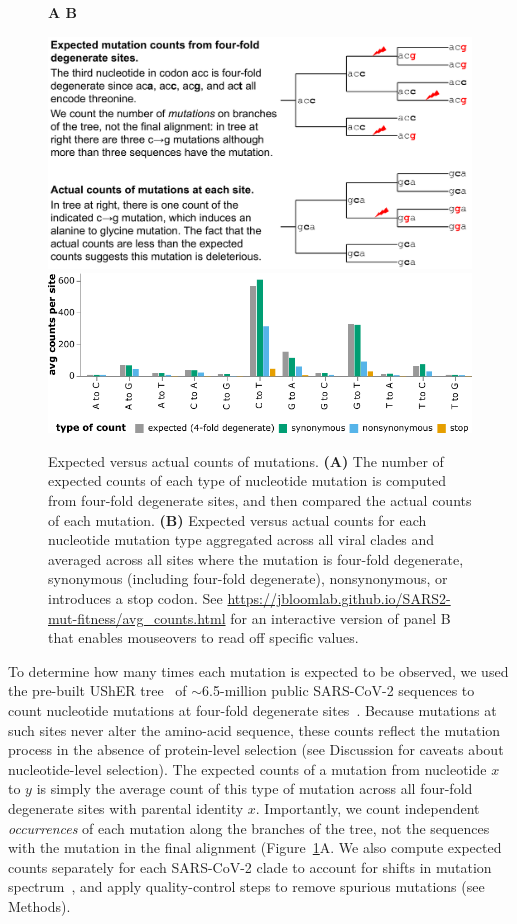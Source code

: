 \documentclass[9pt,twocolumn,twoside]{gsajnl_modified}
\begin{document}
\begin{figure}
{\bf \Large A \hspace{0.47\linewidth} B}

\includegraphics[width=0.48\linewidth,valign=t]{figs/schematic/schematic.pdf}
\hspace{0.02\linewidth}
\includegraphics[width=0.5\linewidth,valign=t]{figs/avg_counts.pdf}
\caption{
Expected versus actual counts of mutations.
{\bf (A)}
The number of expected counts of each type of nucleotide mutation is computed from four-fold degenerate sites, and then compared the actual counts of each mutation.
{\bf (B)}
Expected versus actual counts for each nucleotide mutation type aggregated across all viral clades and averaged across all sites where the mutation is four-fold degenerate, synonymous (including four-fold degenerate), nonsynonymous, or introduces a stop codon.
See \url{https://jbloomlab.github.io/SARS2-mut-fitness/avg_counts.html} for an interactive version of panel B that enables mouseovers to read off specific values.
\label{fig:expected_vs_actual}
}
\end{figure}

To determine how many times each mutation is expected to be observed, we used the pre-built UShER tree~\citep{turakhia2021ultrafast,lanfear2020} of $\sim$6.5-million public SARS-CoV-2 sequences to count nucleotide mutations at four-fold degenerate sites~\citep[Figure~\ref{fig:expected_vs_actual}A;][]{bloom2022evolution}.
Because mutations at such sites never alter the amino-acid sequence, these counts reflect the mutation process in the absence of protein-level selection (see Discussion for caveats about nucleotide-level selection).
The expected counts of a mutation from nucleotide $x$ to $y$ is simply the average count of this type of mutation across all four-fold degenerate sites with parental identity $x$.
Importantly, we count independent \emph{occurrences} of each mutation along the branches of the tree, not the sequences with the mutation in the final alignment (Figure~\ref{fig:expected_vs_actual}A.
We also compute expected counts separately for each SARS-CoV-2 clade to account for shifts in mutation spectrum~\citep{bloom2022evolution,ruis2022mutational}, and apply quality-control steps to remove spurious mutations (see Methods).
\end{document}
